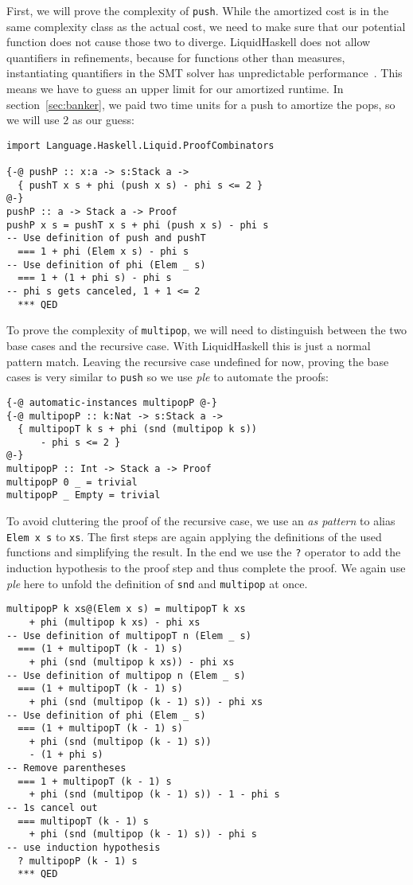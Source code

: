 \documentclass[sigplan,screen]{acmart}
\begin{document}
First, we will prove the complexity of \texttt{push}. While the amortized cost is in the same complexity class as the actual cost, we need to make sure that our potential function does not cause those two to diverge. LiquidHaskell does not allow quantifiers in refinements, because for functions other than measures, instantiating quantifiers in the SMT solver has unpredictable performance~\cite{lh_quantifiers}. This means we have to guess an upper limit for our amortized runtime. In section~\ref{sec:banker}, we paid two time units for a push to amortize the pops, so we will use $2$ as our guess:

\begin{lstlisting}
import Language.Haskell.Liquid.ProofCombinators

{-@ pushP :: x:a -> s:Stack a ->
  { pushT x s + phi (push x s) - phi s <= 2 }
@-}
pushP :: a -> Stack a -> Proof
pushP x s = pushT x s + phi (push x s) - phi s
-- Use definition of push and pushT
  === 1 + phi (Elem x s) - phi s
-- Use definition of phi (Elem _ s)
  === 1 + (1 + phi s) - phi s
-- phi s gets canceled, 1 + 1 <= 2
  *** QED
\end{lstlisting}

To prove the complexity of \texttt{multipop}, we will need to distinguish between the two base cases and the recursive case. With LiquidHaskell this is just a normal pattern match. Leaving the recursive case undefined for now, proving the base cases is very similar to \texttt{push} so we use \textit{ple} to automate the proofs:

\begin{lstlisting}
{-@ automatic-instances multipopP @-}
{-@ multipopP :: k:Nat -> s:Stack a ->
  { multipopT k s + phi (snd (multipop k s))
      - phi s <= 2 }
@-}
multipopP :: Int -> Stack a -> Proof
multipopP 0 _ = trivial
multipopP _ Empty = trivial
\end{lstlisting}

To avoid cluttering the proof of the recursive case, we use an \textit{as pattern} to alias \texttt{Elem x s} to \texttt{xs}. The first steps are again applying the definitions of the used functions and simplifying the result. In the end we use the \texttt{?} operator to add the induction hypothesis to the proof step and thus complete the proof. We again use \textit{ple} here to unfold the definition of \texttt{snd} and \texttt{multipop} at once.

\begin{lstlisting}
multipopP k xs@(Elem x s) = multipopT k xs
    + phi (multipop k xs) - phi xs
-- Use definition of multipopT n (Elem _ s)
  === (1 + multipopT (k - 1) s)
    + phi (snd (multipop k xs)) - phi xs
-- Use definition of multipop n (Elem _ s)
  === (1 + multipopT (k - 1) s)
    + phi (snd (multipop (k - 1) s)) - phi xs
-- Use definition of phi (Elem _ s)
  === (1 + multipopT (k - 1) s)
    + phi (snd (multipop (k - 1) s))
    - (1 + phi s)
-- Remove parentheses
  === 1 + multipopT (k - 1) s
    + phi (snd (multipop (k - 1) s)) - 1 - phi s
-- 1s cancel out
  === multipopT (k - 1) s
    + phi (snd (multipop (k - 1) s)) - phi s
-- use induction hypothesis
  ? multipopP (k - 1) s
  *** QED
\end{lstlisting}
\end{document}
